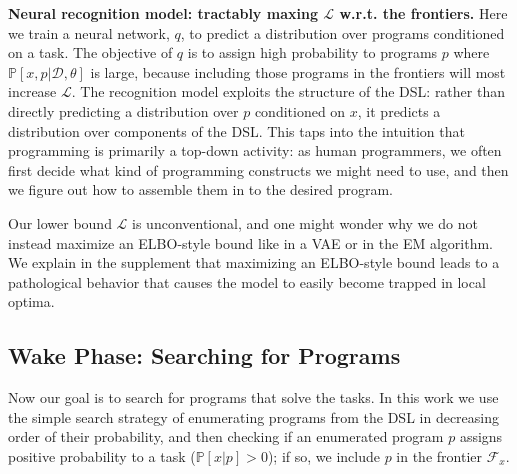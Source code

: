 \documentclass{article}
\newcommand{\lowerBound}{\mathscr{L}}
\newcommand{\probability}{\mathds{P}} %
\begin{document}
\textbf{Neural recognition model: tractably maxing $\lowerBound$ w.r.t. the
  frontiers.}  Here we train a neural network, $q$, to predict a
distribution over programs conditioned on a task. The objective of $q$
is to assign high probability to programs $p$ where
$\probability[x,p|\mathcal{D},\theta]$ is large, because including those programs
in the frontiers will most increase $\lowerBound$.  %
The recognition model exploits the structure of the DSL: %
rather than directly predicting a distribution over $p$ conditioned on $x$,
it predicts a distribution over components of the DSL.
This taps into the intuition that programming is primarily a top-down activity:
as human programmers, we often first decide what kind of
programming constructs we might need to use,
and then we figure out how to assemble them in to the desired program.

Our lower bound $\lowerBound$ is unconventional,
and one might wonder why we do not instead maximize an ELBO-style bound like in a VAE or in the EM algorithm.
We explain in the supplement that maximizing an ELBO-style bound
leads to a pathological behavior that  causes the model to easily become trapped in local optima.





\subsection{Wake Phase: Searching for Programs}\label{explorationSection}

Now our goal is to search for programs that solve the tasks.  In this
work we use the simple search strategy of enumerating programs from
the DSL  in decreasing order of their probability,
and then checking if an enumerated program $p$ assigns positive
probability to a task ($\probability[x|p] > 0$); if so, we include $p$ in
the frontier $\mathcal{F}_x$.
\end{document}
